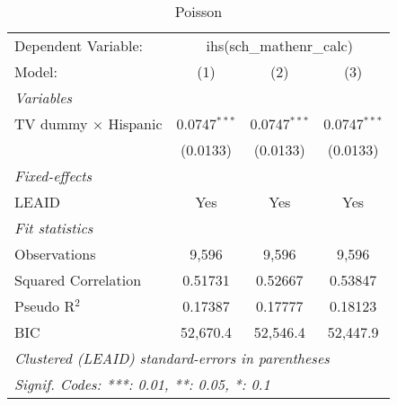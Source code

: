\begin{table}[htbp]
\centering
\caption{Poisson}
\begin{tabular}{lccc}
\tabularnewline\midrule\midrule
Dependent Variable:&\multicolumn{3}{c}{ihs(sch\_mathenr\_calc)}\\
Model:&(1) & (2) & (3)\\
\midrule \emph{Variables}&   &   &  \\
TV dummy $\times$ Hispanic & 0.0747$^{***}$ & 0.0747$^{***}$ & 0.0747$^{***}$\\
  &(0.0133) & (0.0133) & (0.0133)\\
\midrule \emph{Fixed-effects}&   &   &  \\
LEAID & Yes & Yes & Yes\\
\midrule \emph{Fit statistics}&  & & \\
Observations & 9,596&9,596&9,596\\
Squared Correlation & 0.51731&0.52667&0.53847\\
Pseudo R$^2$ & 0.17387&0.17777&0.18123\\
BIC & 52,670.4&52,546.4&52,447.9\\
\midrule\midrule\multicolumn{4}{l}{\emph{Clustered (LEAID) standard-errors in parentheses}}\\
\multicolumn{4}{l}{\emph{Signif. Codes: ***: 0.01, **: 0.05, *: 0.1}}\\
\end{tabular}
\end{table}

